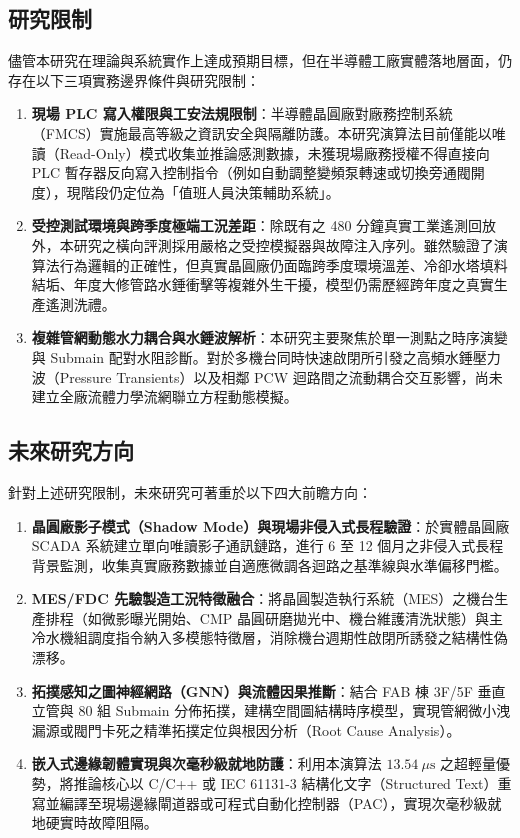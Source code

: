 \documentclass[fontset=none, a4paper, 12pt]{ctexart}
\begin{document}
\begin{doublespace}
\subsection{研究限制}
儘管本研究在理論與系統實作上達成預期目標，但在半導體工廠實體落地層面，仍存在以下三項實務邊界條件與研究限制：
\begin{enumerate}
    \item \textbf{現場 PLC 寫入權限與工安法規限制}：半導體晶圓廠對廠務控制系統（FMCS）實施最高等級之資訊安全與隔離防護。本研究演算法目前僅能以唯讀（Read-Only）模式收集並推論感測數據，未獲現場廠務授權不得直接向 PLC 暫存器反向寫入控制指令（例如自動調整變頻泵轉速或切換旁通閥開度），現階段仍定位為「值班人員決策輔助系統」。
    \item \textbf{受控測試環境與跨季度極端工況差距}：除既有之 480 分鐘真實工業遙測回放外，本研究之橫向評測採用嚴格之受控模擬器與故障注入序列。雖然驗證了演算法行為邏輯的正確性，但真實晶圓廠仍面臨跨季度環境溫差、冷卻水塔填料結垢、年度大修管路水錘衝擊等複雜外生干擾，模型仍需歷經跨年度之真實生產遙測洗禮。
    \item \textbf{複雜管網動態水力耦合與水錘波解析}：本研究主要聚焦於單一測點之時序演變與 Submain 配對水阻診斷。對於多機台同時快速啟閉所引發之高頻水錘壓力波（Pressure Transients）以及相鄰 PCW 迴路間之流動耦合交互影響，尚未建立全廠流體力學流網聯立方程動態模擬。
\end{enumerate}

\subsection{未來研究方向}
針對上述研究限制，未來研究可著重於以下四大前瞻方向：
\begin{enumerate}
    \item \textbf{晶圓廠影子模式（Shadow Mode）與現場非侵入式長程驗證}：於實體晶圓廠 SCADA 系統建立單向唯讀影子通訊鏈路，進行 6 至 12 個月之非侵入式長程背景監測，收集真實廠務數據並自適應微調各迴路之基準線與水準偏移門檻。
    \item \textbf{MES/FDC 先驗製造工況特徵融合}：將晶圓製造執行系統（MES）之機台生產排程（如微影曝光開始、CMP 晶圓研磨拋光中、機台維護清洗狀態）與主冷水機組調度指令納入多模態特徵層，消除機台週期性啟閉所誘發之結構性偽漂移。
    \item \textbf{拓撲感知之圖神經網路（GNN）與流體因果推斷}：結合 FAB 棟 3F/5F 垂直立管與 80 組 Submain 分佈拓撲，建構空間圖結構時序模型，實現管網微小洩漏源或閥門卡死之精準拓撲定位與根因分析（Root Cause Analysis）。
    \item \textbf{嵌入式邊緣韌體實現與次毫秒級就地防護}：利用本演算法 $13.54\ \mu\mathrm{s}$ 之超輕量優勢，將推論核心以 C/C++ 或 IEC 61131-3 結構化文字（Structured Text）重寫並編譯至現場邊緣閘道器或可程式自動化控制器（PAC），實現次毫秒級就地硬實時故障阻隔。
\end{enumerate}


\end{doublespace}
\end{document}
